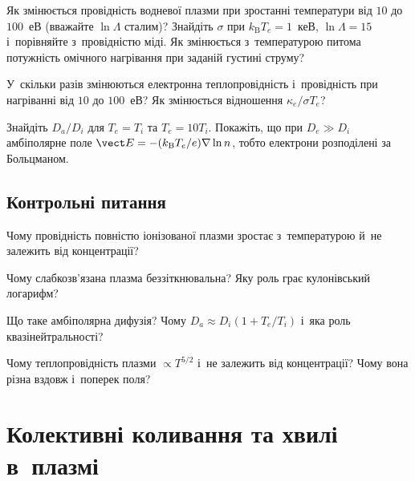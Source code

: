 \begin{problem}\label{prb:PlasmaConductivity}
	Як змінюється провідність водневої плазми при зростанні температури від $10$ до
	$100$~еВ (вважайте $\ln\Lambda$ сталим)? Знайдіть $\sigma$ при $k_{\mathrm
	B}T_e=1$~кеВ, $\ln\Lambda=15$ і~порівняйте з~провідністю міді. Як змінюється
	з~температурою питома потужність омічного нагрівання при заданій густині струму?
\end{problem}

\begin{problem}\label{prb:PlasmaThermal}
	У~скільки разів змінюються електронна теплопровідність і~провідність при нагріванні
	від $10$ до $100$~еВ? Як змінюється відношення $\kappa_e/\sigma T_e$?
\end{problem}

\begin{problem}\label{prb:PlasmaAmbipolar}
	Знайдіть $D_a/D_i$ для $T_e=T_i$ та $T_e=10T_i$. Покажіть, що при $D_e\gg D_i$
	амбіполярне поле $\vect E=-(k_{\mathrm B}T_e/e)\nabla\ln n$, тобто електрони
	розподілені за Больцманом.
\end{problem}

\section*{Контрольні питання}

\begin{Questions}
\begin{quizlist}
\item Чому провідність повністю іонізованої плазми зростає з~температурою й~не
		  залежить від концентрації?

\item Чому слабкозв'язана плазма беззіткнювальна? Яку роль грає кулонівський
		  логарифм?

\item Що таке амбіполярна дифузія? Чому $D_a\approx D_i(1+T_e/T_i)$ і~яка роль
		  квазінейтральності?

\item Чому теплопровідність плазми $\propto T^{5/2}$ і~не залежить від
		  концентрації? Чому вона різна вздовж і~поперек поля?

\end{quizlist}
\end{Questions}

\chapter{Колективні коливання та хвилі в~плазмі}\label{sec:plasma-waves}\hypertarget{plasma-waves}{}

